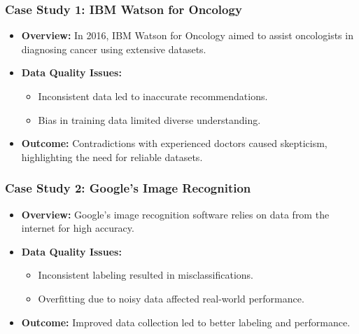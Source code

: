 \documentclass[aspectratio=169]{beamer}
\begin{document}
\begin{frame}[fragile]
    \frametitle{Case Study 1: IBM Watson for Oncology}
    \begin{itemize}
        \item \textbf{Overview:} 
        In 2016, IBM Watson for Oncology aimed to assist oncologists in diagnosing cancer using extensive datasets.
        
        \item \textbf{Data Quality Issues:}
        \begin{itemize}
            \item Inconsistent data led to inaccurate recommendations.
            \item Bias in training data limited diverse understanding.
        \end{itemize}
        
        \item \textbf{Outcome:} 
        Contradictions with experienced doctors caused skepticism, highlighting the need for reliable datasets.
    \end{itemize}
\end{frame}

\begin{frame}[fragile]
    \frametitle{Case Study 2: Google's Image Recognition}
    \begin{itemize}
        \item \textbf{Overview:} 
        Google's image recognition software relies on data from the internet for high accuracy.
        
        \item \textbf{Data Quality Issues:}
        \begin{itemize}
            \item Inconsistent labeling resulted in misclassifications.
            \item Overfitting due to noisy data affected real-world performance.
        \end{itemize}
        
        \item \textbf{Outcome:} 
        Improved data collection led to better labeling and performance.
    \end{itemize}
\end{frame}
\end{document}
